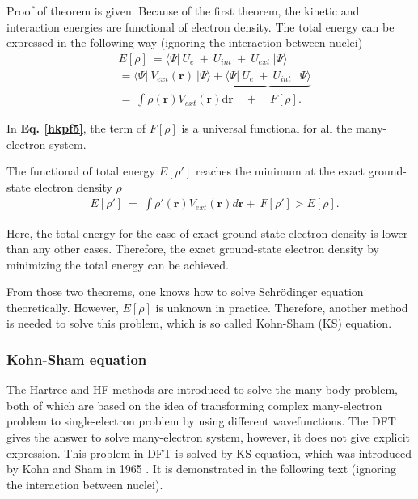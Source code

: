 \documentclass[a4paper, 12pt, titlepage,oneside,drop]{kthesis}
\begin{document}
Proof of theorem is given. Because of the first theorem, the kinetic and interaction energies are functional of electron density. The total energy can be expressed in the following way (ignoring the interaction between nuclei)
\begin{equation}\label{hkpf5}\begin{split}
& E[\rho] \ = \langle \Psi  | \ {U_e} \ + \ {U}_{int}  \ + \ {U}_{ext} \ | \Psi \rangle \\
&     = \langle \Psi  | \ {V}_{ext}(\textbf{r}) \ | \Psi \rangle  + \underbrace{\langle \Psi  | \ {U_e} \ + \ {U}_{int}  \ \ | \Psi \rangle}  \\
&     =   \ \int \rho(\textbf{r}) V_{ext}(\textbf{r}) \mathrm{d}\textbf{r} \quad +  \quad F[\rho]. 
\end{split}
\end{equation}

In \textbf{Eq. \ref{hkpf5}}, the term of $F[\rho]$ is a universal functional for all the many-electron system.

The functional of total energy $E[\rho']$ reaches the minimum at the exact ground-state electron density $\rho$
\begin{equation}\begin{split}
 & E[\rho'] \ =   \ \int \rho'(\textbf{r}) V_{ext}(\textbf{r}) d \textbf{r}   + \  F[\rho'] > E[\rho]. 
\end{split}
\end{equation}
 
Here, the total energy for the case of exact ground-state electron density is lower than any other cases. Therefore, the exact ground-state electron density by minimizing the total energy can be achieved.

From those two theorems, one knows how to solve Schrödinger equation theoretically. However, $E[\rho]$ is unknown in practice. Therefore, another method is needed to solve this problem, which is so called Kohn-Sham (KS) equation.

\subsubsection{Kohn-Sham equation}

The Hartree and HF methods are introduced to solve the many-body problem, both of which are based on the idea of transforming complex 
many-electron problem to single-electron problem by using different wavefunctions. The DFT gives the answer to solve many-electron system, however, it does not give explicit expression.
This problem in DFT is solved by KS equation, which was introduced by Kohn and Sham in 1965 \cite{kohn1965self}. It is demonstrated in the following text (ignoring the interaction between nuclei).
\end{document}
